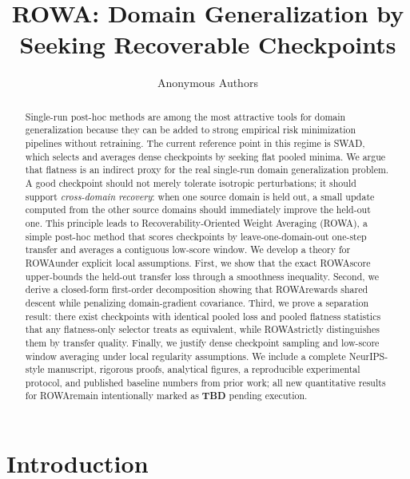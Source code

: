 \documentclass{article}
\title{ROWA: Domain Generalization by Seeking Recoverable Checkpoints}
\author{Anonymous Authors}
\newcommand{\TBD}{\textbf{TBD}}
\newcommand{\rowa}{\textup{\textsc{ROWA}}}
\newcommand{\swad}{\textup{\textsc{SWAD}}}
\begin{document}
\maketitle

\begin{abstract}
Single-run post-hoc methods are among the most attractive tools for domain generalization because they can be added to strong empirical risk minimization pipelines without retraining. The current reference point in this regime is \swad, which selects and averages dense checkpoints by seeking flat pooled minima. We argue that flatness is an indirect proxy for the real single-run domain generalization problem. A good checkpoint should not merely tolerate isotropic perturbations; it should support \emph{cross-domain recovery}: when one source domain is held out, a small update computed from the other source domains should immediately improve the held-out one. This principle leads to Recoverability-Oriented Weight Averaging (\rowa), a simple post-hoc method that scores checkpoints by leave-one-domain-out one-step transfer and averages a contiguous low-score window. We develop a theory for \rowa under explicit local assumptions. First, we show that the exact \rowa score upper-bounds the held-out transfer loss through a smoothness inequality. Second, we derive a closed-form first-order decomposition showing that \rowa rewards shared descent while penalizing domain-gradient covariance. Third, we prove a separation result: there exist checkpoints with identical pooled loss and pooled flatness statistics that any flatness-only selector treats as equivalent, while \rowa strictly distinguishes them by transfer quality. Finally, we justify dense checkpoint sampling and low-score window averaging under local regularity assumptions. We include a complete NeurIPS-style manuscript, rigorous proofs, analytical figures, a reproducible experimental protocol, and published baseline numbers from prior work; all new quantitative results for \rowa remain intentionally marked as \TBD{} pending execution.
\end{abstract}

\section{Introduction}
\end{document}
